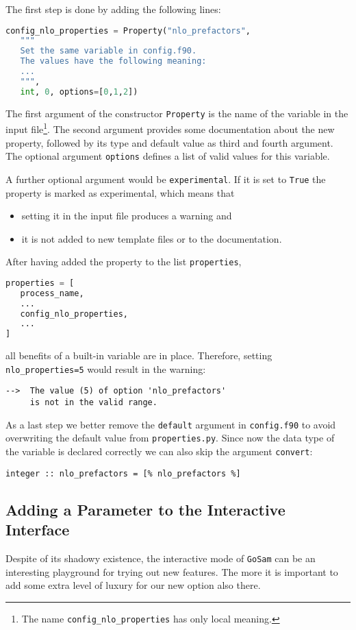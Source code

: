 \documentclass[11pt,a4paper]{refrep}
\newcommand{\golem}{{\tt GoSam}\xspace}
\begin{document}
The first step is done by adding the following lines:
\begin{lstlisting}[language=Python]
config_nlo_properties = Property("nlo_prefactors",
   """
   Set the same variable in config.f90.
   The values have the following meaning:
   ...
   """,
   int, 0, options=[0,1,2])
\end{lstlisting}
The first argument of the constructor \texttt{Property}
is the name of the variable in the input file\footnote{%
The name \texttt{config\_nlo\_properties} has only local meaning.}.
The second argument provides some documentation about the new
property, followed by its type and default value as third and fourth
argument. The optional argument \texttt{options} defines a list of
valid values for this variable.

A further optional argument would be \texttt{experimental}.
If it is set to \texttt{True} the property is marked as experimental,
which means that
\begin{itemize}
\item setting it in the input file produces a warning and
\item it is not added to new template files or to the documentation.
\end{itemize}

After having added the property to the list \texttt{properties},
\begin{lstlisting}[language=Python]
properties = [
   process_name,
   ...
   config_nlo_properties,
   ...
]
\end{lstlisting}
all benefits of a built-in variable are in place. Therefore,
setting \texttt{nlo\_properties=5} would result in the warning:
\begin{verbatim}
-->  The value (5) of option 'nlo_prefactors'
     is not in the valid range.
\end{verbatim}

As a last step we better remove the \texttt{default} argument in
\texttt{config.f90} to avoid overwriting the default value from
\texttt{properties.py}. Since now the data type of the variable
is declared correctly we can also skip the argument \texttt{convert}:
\begin{lstlisting}
integer :: nlo_prefactors = [% nlo_prefactors %]
\end{lstlisting}

\subsection{Adding a Parameter to the Interactive Interface}
\label{ssec:nlo-prefactors:04}
Despite of its shadowy existence, the interactive mode of \golem{}
can be an interesting playground for trying out new features.
The more it is important to add some extra level of luxury for our
new option also there.
\end{document}
